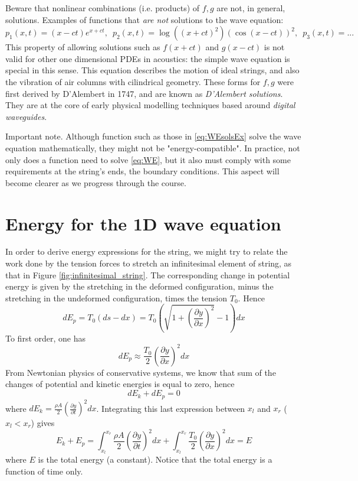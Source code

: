 \documentclass[11pt,twoside,a4paper,english]{book}
\begin{document}
Beware that nonlinear combinations (i.e. products) of $f,g$ are not, in general, solutions. Examples of functions that \emph{are not} solutions to the wave equation:
\begin{equation}
p_1(x,t) = (x-ct)e^{x+ct}, \,\,\, p_2(x,t) = \log \left( (x+ct)^2 \right)\left(\cos(x-ct)\right)^2, \,\,\, p_3(x,t) = ...
\end{equation}
This property of allowing solutions such as $f(x+ct)$ and $g(x-ct)$ is not valid for other one dimensional PDEs in acoustics: the simple wave equation is special in this sense. This equation describes the motion of ideal strings, and also the vibration of air columns with cilindrical geometry. These forms for $f,g$ were first derived by D'Alembert in 1747, and are known as \emph{D'Alembert solutions}. They are at the core of early physical modelling techniques based around \emph{digital waveguides}.


Important note. Although function such as those in \eqref{eq:WEsolsEx} solve the wave equation mathematically, they might not be "energy-compatible". In practice, not only does a function need to solve \eqref{eq:WE}, but it also must comply with some requirements at the string's ends, the boundary conditions. This aspect will become clearer as we progress through the course.

\section{Energy for the 1D wave equation}


In order to derive energy expressions for the string, we might try to relate the work done by the tension forces to stretch an infinitesimal element of string, as that in Figure \ref{fig:infinitesimal_string}. The corresponding change in potential energy is given by the stretching in the deformed configuration, minus the stretching in the undeformed configuration, times the tension $T_0$. Hence
\begin{equation}
dE_p =  T_0 (ds-dx) =  T_0  \left(\sqrt{1 + \left( \frac{\partial y}{\partial x}\right)^2} - 1 \right)dx
\end{equation}
To first order, one has
\begin{equation}
dE_p \approx \frac{T_0}{2}\left(\frac{\partial y}{\partial x}\right)^2 dx
\end{equation}
From Newtonian physics of conservative systems, we know that sum of the changes of potential and kinetic energies is equal to zero, hence
\begin{equation}
dE_k + dE_p = 0 
\end{equation}
where $dE_k = \frac{\rho A}{2} \left( \frac{\partial y}{\partial t} \right)^2 dx$. Integrating this last expression between $x_l $ and $x_r$ ($x_l<x_r$) gives
\begin{equation}\label{eq:EnBal}
E_k + E_p = \int_{x_l}^{x_r} \frac{\rho A}{2} \left(\frac{\partial y}{\partial t}\right)^2 dx + \int_{x_l}^{x_r} \frac{T_0}{2} \left(\frac{\partial y}{\partial x}\right)^2 dx = E
\end{equation}
where $E$ is the total energy (a constant). Notice that the total energy is a function of time only. 
\end{document}
